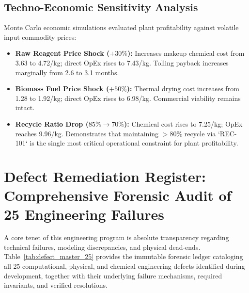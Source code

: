 \documentclass[10pt,a4paper]{article}
\newcommand{\inr}{\text{INR~}}
\begin{document}
\subsection{Techno-Economic Sensitivity Analysis}
Monte Carlo economic simulations evaluated plant profitability against volatile input commodity prices:
\begin{itemize}[leftmargin=1.5em]
    \item \textbf{Raw Reagent Price Shock ($+30\%$):} Increases makeup chemical cost from \inr3.63 to \inr4.72/kg; direct OpEx rises to \inr7.43/kg. Tolling payback increases marginally from 2.6 to 3.1 months.
    \item \textbf{Biomass Fuel Price Shock ($+50\%$):} Thermal drying cost increases from \inr1.28 to \inr1.92/kg; direct OpEx rises to \inr6.98/kg. Commercial viability remains intact.
    \item \textbf{Recycle Ratio Drop ($85\% \rightarrow 70\%$):} Chemical cost rises to \inr7.25/kg; OpEx reaches \inr9.96/kg. Demonstrates that maintaining $> 80\%$ recycle via `REC-101` is the single most critical operational constraint for plant profitability.
\end{itemize}


\section{Defect Remediation Register: Comprehensive Forensic Audit of 25 Engineering Failures}

A core tenet of this engineering program is absolute transparency regarding technical failures, modeling discrepancies, and physical dead-ends. Table~\ref{tab:defect_master_25} provides the immutable forensic ledger cataloging all 25 computational, physical, and chemical engineering defects identified during development, together with their underlying failure mechanisms, required invariants, and verified resolutions.
\end{document}
